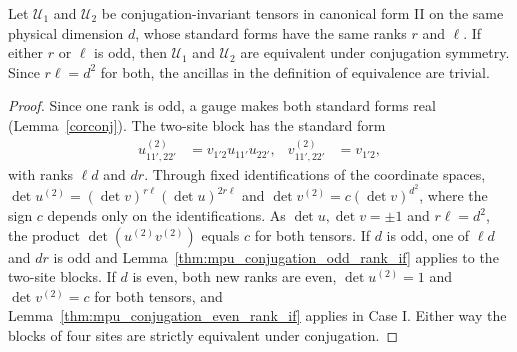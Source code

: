 \begin{corollary}
    \label{cor:all-equivalent-under-conjugation}
    \leanok
    Let $\mathcal U_1$ and $\mathcal U_2$ be conjugation-invariant tensors in
    canonical form II on the same physical dimension $d$, whose standard forms
    have the same ranks $r$ and $\ell$. If either $r$ or $\ell$ is odd, then
    $\mathcal U_1$ and $\mathcal U_2$ are equivalent under conjugation
    symmetry. Since $r\ell=d^2$ for both, the ancillas in the definition of
    equivalence are trivial.
\end{corollary}

\begin{proof}
    \leanok
    Since one rank is odd, a gauge makes both standard forms real
    (Lemma~\ref{corconj}). The two-site block has the standard form
    \begin{align}
        u^{(2)}_{11',22'} & =v_{1'2}u_{11'}u_{22'},
                          & v^{(2)}_{11',22'}       & =v_{1'2},
    \end{align}
    with ranks $\ell d$ and $dr$. Through fixed identifications of the
    coordinate spaces, $\det u^{(2)}=(\det v)^{r\ell}(\det u)^{2r\ell}$ and
    $\det v^{(2)}=c(\det v)^{d^2}$, where the sign $c$ depends only on the
    identifications. As $\det u,\det v=\pm1$ and $r\ell=d^2$, the product
    $\det(u^{(2)}v^{(2)})$ equals $c$ for both tensors. If $d$ is odd, one of
    $\ell d$ and $dr$ is odd and
    Lemma~\ref{thm:mpu_conjugation_odd_rank_if} applies to the two-site
    blocks. If $d$ is even, both new ranks are even, $\det u^{(2)}=1$ and
    $\det v^{(2)}=c$ for both tensors, and
    Lemma~\ref{thm:mpu_conjugation_even_rank_if} applies in Case I. Either way
    the blocks of four sites are strictly equivalent under conjugation.
\end{proof}

